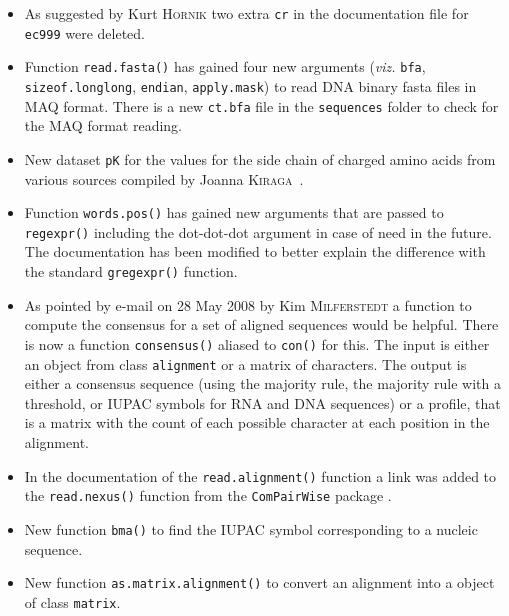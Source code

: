 \documentclass{article}
\begin{document}
\begin{itemize}

\item As suggested by Kurt \textsc{Hornik} two extra \texttt{cr} in the
  documentation file for \texttt{ec999} were deleted.

\item Function \texttt{read.fasta()} has gained four new arguments
  (\textit{viz.} \texttt{bfa}, \texttt{sizeof.longlong},
  \texttt{endian}, \texttt{apply.mask}) to read DNA binary fasta
  files in MAQ format. There is a new \texttt{ct.bfa} file
  in the \texttt{sequences} folder to check for the MAQ format
  reading.

\item New dataset \texttt{pK} for the values for the side chain of charged amino acids from various sources compiled by Joanna \textsc{Kiraga}~\cite{KiragaJ2008}.

\item Function \texttt{words.pos()} has gained new arguments that
  are passed to \texttt{regexpr()} including the dot-dot-dot
  argument in case of need in the future. The documentation has
  been modified to better explain the difference with the standard
  \texttt{gregexpr()} function.

\item As pointed by e-mail on 28 May 2008 by Kim \textsc{Milferstedt} a
  function to compute the consensus for a set of aligned sequences
  would be helpful. There is now a function \texttt{consensus()}
  aliased to \texttt{con()} for this. The input is either an object
  from class \texttt{alignment} or a matrix of characters. The
  output is either a consensus sequence (using the majority rule,
  the majority rule with a threshold, or IUPAC symbols for RNA
  and DNA sequences) or a profile, that is a matrix with the count 
  of each possible character at each position in the alignment.

\item In the documentation of the \texttt{read.alignment()} function
  a link was added to the \texttt{read.nexus()} function from the
  \texttt{ComPairWise} package \cite{ComPairWise}.

\item New function \texttt{bma()} to find the IUPAC symbol corresponding
  to a nucleic sequence.

\item New function \texttt{as.matrix.alignment()} to convert an
  alignment into a object of class \texttt{matrix}.


\end{itemize}
\end{document}
